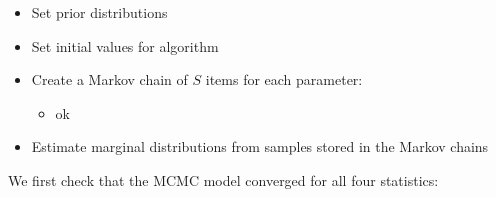 \documentclass[]{article}
\begin{document}
\begin{enumerate}
        \begin{itemize}
          \item Set prior distributions
          \item Set initial values for algorithm
          \item Create a Markov chain of $S$ items for each parameter:
            \begin{itemize}
              \item ok
            \end{itemize}
          \item Estimate marginal distributions from samples stored in the Markov chains
        \end{itemize}
        We first check that the MCMC model converged for all four statistics:
\end{enumerate}
\end{document}
